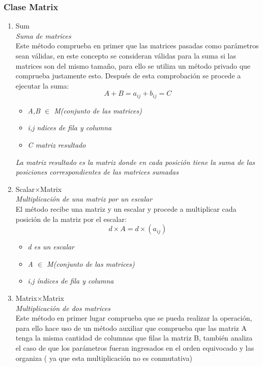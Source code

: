 \documentclass[options]{article}
\begin{document}
\subsubsection{Clase Matrix}
\begin{enumerate}
    \item Sum\\
    \textit{Suma de matrices}\\
    Este método comprueba en primer que las matrices pasadas como parámetros sean válidas, en este concepto se consideran válidas para la suma si las matrices son del mismo tamaño, para ello se utiliza un método privado que comprueba justamente esto. Después de esta comprobación se procede a ejecutar la suma:\\
    \begin{equation}
        A + B = a_{ij} + b_{ij} = C
    \end{equation}
    \begin{itemize}
        \item \textit{A,B $\in $ M(conjunto de las matrices)}
        \item \textit{i,j ndices de fila y columna}
        \item \textit{C matriz resultado}
    \end{itemize}
    \textit{La matriz resultado es la matriz donde en cada posición tiene la suma de las posiciones correspondientes de las matrices sumadas}
    \item Scalar$\times $Matrix\\
    \textit{Multiplicación de una matriz por un escalar}\\
    El método recibe una matriz y un escalar y procede a multiplicar cada posición de la matriz por el escalar:
    \begin{equation}
        d\times A = d\times (a_{ij})
    \end{equation}
    \begin{itemize}
        \item \textit{d es un escalar}
        \item \textit{A $\in $ M(conjunto de las matrices)}
        \item \textit{i,j índices de fila y columna}
    \end{itemize}
    \item Matrix$\times $Matrix\\
    \textit{Multiplicación de dos matrices}\\
    Este método en primer lugar comprueba que se pueda realizar la operación, para ello hace uso de un método auxiliar que comprueba que las matriz A tenga la misma cantidad de columnas que filas la matriz B, también analiza el caso de que los parámetros fueran ingresados en el orden equivocado y las organiza ( ya que esta multiplicación no es conmutativa)\\

\end{enumerate}
\end{document}
